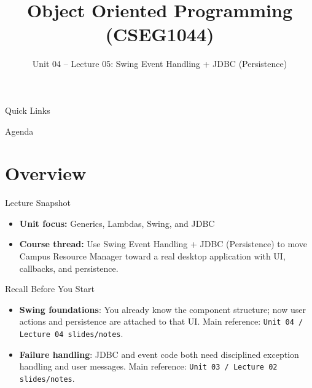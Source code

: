 \documentclass{beamer}
\title[OOPS with Java]{Object Oriented Programming (CSEG1044)}
\subtitle{Unit 04 -- Lecture 05: Swing Event Handling + JDBC (Persistence)}
\begin{document}
\begin{frame}[fragile]
  \titlepage
  \vspace{0.5em}
  \slidesources{\OOPSUnitIVSources}
\end{frame}

\begin{frame}{Quick Links}
  \centering
  \hyperlink{sec:overview}{}\hspace{0.6em}
  \hyperlink{sec:concepts}{}\hspace{0.6em}
  \hyperlink{sec:demo}{}\hspace{0.6em}
  \hyperlink{sec:summary}{}
  \slidesources{\OOPSUnitIVSources}
\end{frame}

\begin{frame}{Agenda}
  \tableofcontents
  \slidesources{\OOPSUnitIVSources}
\end{frame}

\section{Overview}
\label{sec:overview}

\begin{frame}{Lecture Snapshot}
\begin{itemize}[<+->]
  \item \textbf{Unit focus:} Generics, Lambdas, Swing, and JDBC
  \item \textbf{Course thread:} Use Swing Event Handling + JDBC (Persistence) to move Campus Resource Manager toward a real desktop application with UI, callbacks, and persistence.
\end{itemize}
  \slidesources{\OOPSUnitIVSources}
\end{frame}

\begin{frame}{Recall Before You Start}
\begin{itemize}[<+->]
  \item \textbf{Swing foundations}: You already know the component structure; now user actions and persistence are attached to that UI. Main reference: \texttt{Unit 04 / Lecture 04 slides/notes}.
  \item \textbf{Failure handling}: JDBC and event code both need disciplined exception handling and user messages. Main reference: \texttt{Unit 03 / Lecture 02 slides/notes}.
\end{itemize}
  \slidesources{\OOPSUnitIVSources}
\end{frame}
\end{document}
